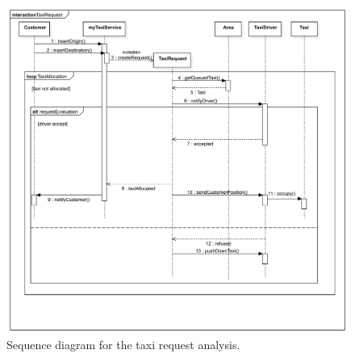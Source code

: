 \begin{figure}
	\includegraphics[width=\textwidth]{img/S_TaxiRequest}
	\caption{Sequence diagram for the taxi request analysis.}
\end{figure}

\clearpage







